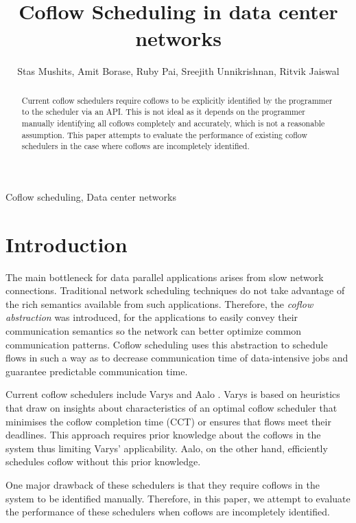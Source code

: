 \documentclass[conference]{IEEEtran}
\title{Coflow Scheduling in data center networks}
\begin{document}
\author{ Stas Mushits, Amit Borase, Ruby Pai, Sreejith Unnikrishnan, Ritvik Jaiswal }

\maketitle


\begin{abstract}
Current coflow schedulers require coflows to be explicitly identified by the programmer to the scheduler via an API. This is not ideal as it depends on the programmer manually identifying all coflows completely and accurately, which is not a reasonable assumption. This paper attempts to evaluate the performance of existing coflow schedulers in the case where coflows are incompletely identified.
\end{abstract}

\begin{IEEEkeywords}
Coflow scheduling, Data center networks
\end{IEEEkeywords}

\section{Introduction}
The main bottleneck for data parallel applications arises from slow network connections. Traditional network scheduling techniques do not take advantage of the rich semantics available from such applications. Therefore, the \textit{coflow abstraction} \cite{coflow} was introduced, for the applications to easily convey their communication semantics so the network can better optimize common communication patterns. Coflow scheduling uses this abstraction to schedule flows in such a way as to decrease communication time of data-intensive jobs and guarantee predictable communication time.

Current coflow schedulers include Varys \cite{varys} and Aalo \cite{aalo}. Varys is based on heuristics that draw on insights about characteristics of an optimal coflow scheduler that minimises the coflow completion time (CCT) or ensures that flows meet their deadlines. This approach requires prior knowledge about the coflows in the system thus limiting Varys' applicability. Aalo, on the other hand, efficiently schedules coflow without this prior knowledge.

One major drawback of these schedulers is that they require coflows in the system to be identified manually. Therefore, in this paper, we attempt to evaluate the performance of these schedulers when coflows are incompletely identified.
\end{document}
